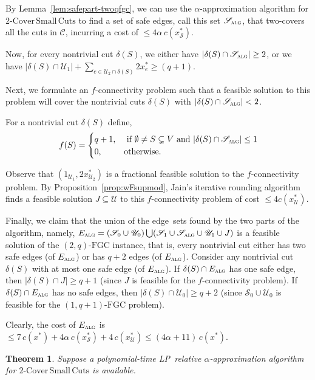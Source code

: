 \documentclass[11pt]{article}
\newtheorem{theorem}{Theorem}
\newcommand{\safe}{\mathscr{S}}
\newcommand{\unsafe}{\mathscr{U}}
\newcommand{\fgc}{\mathrm{FGC}}
\newcommand{\oneqplusfgc}{(1,q+1)\text{-}\fgc}
\newcommand{\C}{\mathscr{C}}
\newcommand{\J}{{J}}
\newcommand{\alg}{\textsc{alg}}
\newcommand{\twoqfgc}{(2,q)\text{-}\fgc}
\newcommand\twoASC{\mathrm{2\text{-}Cover\,Small\,Cuts}}
\begin{document}
{{By Lemma~\ref{lem:safepart-twoqfgc}, we can use the $\alpha$-approximation
algorithm for $\twoASC$ to find a set of safe edges, call this set
$\safe_{\alg}$, that two-covers all the cuts in $\C$, incurring a
cost of $\leq4\alpha\, c(x^*_{\safe})$.


Now, for every nontrivial cut $\delta(S)$,
we either have $|\delta(S)\cap\safe_{\alg}|\geq2$, or we have
$|\delta(S)\cap\unsafe_1| + \sum_{e\in \unsafe_2 \cap\delta(S)} 2x^*_e \geq (q+1)$.

Next, we formulate an $f$-connectivity problem such that
a feasible solution to this problem will cover the nontrivial
cuts $\delta(S)$ with $|\delta(S)\cap\safe_{\alg}|<2$.

For a nontrivial cut $\delta(S)$ define,
\[
f(S) = \begin{cases}
    q+1, &\text{ if } \emptyset\neq{S}\subsetneq{V} \text{ and } |\delta(S)\cap \safe_{\alg}| \leq 1 \\
	0, &\text{otherwise}.
\end{cases}
\]

Observe that $(1_{\unsafe_1}, 2x^*_{\unsafe_2})$ is a fractional
feasible solution to the $f$-connectivity problem.
By Proposition~\ref{prop:wFsupmod}, Jain's iterative rounding
algorithm finds a feasible solution $\J\subseteq{\unsafe}$
to this $f$-connectivity problem of cost $\leq 4c(x^*_{\unsafe})$.


Finally, we claim that the union of the edge~sets found by the two
parts of the algorithm, namely, $E_{\alg}=(\safe_0\cup\unsafe_0)
\bigcup (\safe_1\cup\safe_{\alg}\cup\unsafe_1\cup{\J})$ is a feasible
solution of the $\twoqfgc$ instance, that is, every nontrivial cut
either has two safe edges (of $E_{\alg}$) or has $q+2$ edges (of $E_{\alg}$).
Consider any nontrivial cut $\delta(S)$ with at most one safe edge (of $E_{\alg}$).
If $\delta(S)\cap{E_{\alg}}$ has one safe edge, then $|\delta(S)\cap{\J}|\geq{q+1}$
(since $\J$ is feasible for the $f$-connectivity problem).
If $\delta(S)\cap{E_{\alg}}$ has no safe edges, then $|\delta(S)\cap{\unsafe_0}|\geq{q+2}$
(since $\safe_0\cup\unsafe_0$ is feasible for the $\oneqplusfgc$ problem).

Clearly, the cost of $E_{\alg}$ is $\leq 7\, c(x^*) + 4\alpha\,
c(x^*_{\safe}) + 4\, c(x^*_{\unsafe}) \leq (4\alpha+11)\, c(x^*)$.


{
\begin{theorem} \label{thm:approx-twoqfgc}
Suppose a polynomial-time LP~relative $\alpha$-approximation algorithm
for $\twoASC$ is available.


\end{theorem}}}}
\end{document}

